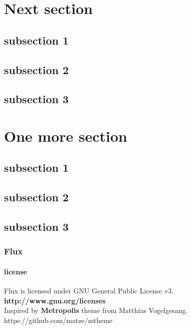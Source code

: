 \documentclass{beamer}
\begin{document}
\section{Next section}
\subsection{subsection 1}
\subsection{subsection 2}
\subsection{subsection 3}
\section{One more section}
\subsection{subsection 1}
\subsection{subsection 2}
\subsection{subsection 3}

\begin{frame}
 \centering
 \frametitle{Flux}
 \framesubtitle{license}
 Flux is licensed under GNU General Public License v3.\\[0.3cm]
 	\centering\textbf{http://www.gnu.org/licenses}\\[0.3cm]
Inspired by \textbf{Metropolis} theme from Matthias Vogelgesang.\\
https://github.com/matze/mtheme 
 
\end{frame}
\end{document}
